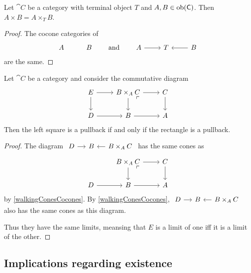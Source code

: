 \begin{lemma} \label{productAsPullback}
Let $\cat{C}$ be a category with terminal object $T$ and $A,B\in\operatorname{ob}(\mathsf{C})$. Then $A\times B = A\times_T B$.
\end{lemma}
\begin{proof}
The cocone categories of
\[ \begin{tikzcd}
A & B
\end{tikzcd} \qquad\text{and}\qquad \begin{tikzcd}
A \ar[r] & T & \ar[l] B
\end{tikzcd} \]
are the same.
\end{proof}


\begin{proposition} \label{pullbackLemma}
Let $\cat{C}$ be a category and consider the commutative diagram
\[ \begin{tikzcd}
E \ar[r] \ar[d] & B\times_A C \pbCorner \ar[d] \ar[r] & C \ar[d] \\
D \ar[r] & B \ar[r] & A
\end{tikzcd} \]
Then the left square is a pullback \textup{if and only if} the rectangle is a pullback.
\end{proposition}
\begin{proof}
The diagram $\begin{tikzcd}[column sep=small]
D \ar[r] & B & \ar[l] B\times_A C
\end{tikzcd}$ has the same cones as
\[ \begin{tikzcd}
{} & B\times_A C \pbCorner \ar[d] \ar[r] & C \ar[d] \\
D \ar[r] & B \ar[r] & A
\end{tikzcd} \]
by \ref{walkingConesCocones}. By \ref{walkingConesCocones}, $\begin{tikzcd}[column sep=small]
D \ar[r] & B & \ar[l] B\times_A C
\end{tikzcd}$ also has the same cones as this diagram.

Thus they have the same limits, meansing that $E$ is a limit of one iff it is a limit of the other.
\end{proof}

\subsection{Implications regarding existence}

